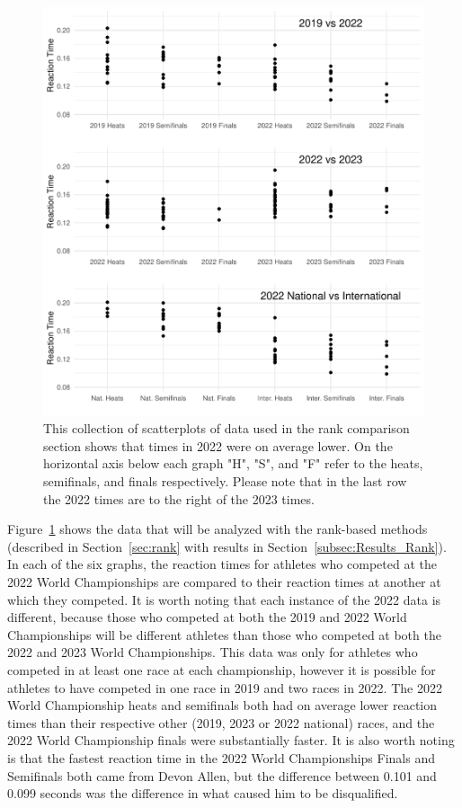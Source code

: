 \documentclass[12pt, letterpaper]{article}
\begin{document}
\begin{figure}[tbp]
  \centering
  \includegraphics{RankScatterPlots}
  \caption{This collection of scatterplots of data used in the rank comparison
  section shows that times in 2022 were on average lower. On the horizontal
  axis below each graph "H", "S", and "F" refer to the heats, semifinals, and 
  finals respectively. Please note that in the last row the 2022 times are to
  the right of the 2023 times.}
  \label{fig:RankScatterplots}
\end{figure}

Figure~\ref{fig:RankScatterplots} shows the data that will be analyzed
with the rank-based methods (described in Section~\ref{sec:rank} with results in 
Section~\ref{subsec:Results_Rank}). In each of the six graphs, the reaction 
times for athletes who competed at the 2022 World Championships
are compared to their reaction times at another at which they competed. 
It is worth noting that each instance of the 2022 data is different, because
those who competed at both the 2019 and 2022 World Championships will be
different athletes than those who competed at both the 2022 and 2023 World
Championships. This data was only for athletes who competed
in at least one race at each championship, however it is possible for athletes
to have competed in one race in 2019 and two races in 2022. The 2022 World
Championship heats and semifinals both had on average lower reaction times than
their respective other (2019, 2023 or 2022 national) races, and the 2022 World 
Championship finals were substantially faster.  It
is also worth noting is that the fastest reaction time in the 2022 World
Championships Finals and Semifinals both came from Devon Allen, but the 
difference between 0.101 and 0.099
seconds was the difference in what caused him to be disqualified. 
\end{document}

